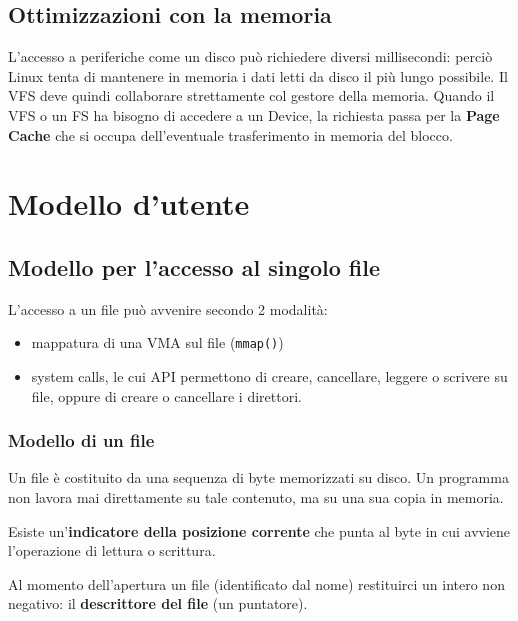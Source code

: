 \documentclass[12pt, a4paper]{report}
\begin{document}
\section{Ottimizzazioni con la memoria}
L'accesso a periferiche come un disco può richiedere diversi millisecondi:
perciò Linux tenta di mantenere in memoria i dati letti da disco il più lungo
possibile. Il VFS deve quindi collaborare strettamente col gestore della
memoria. Quando il VFS o un FS ha bisogno di accedere a un Device, la richiesta
passa per la \textbf{Page Cache} che si occupa dell'eventuale trasferimento in
memoria del blocco.

\chapter{Modello d'utente}
\section{Modello per l'accesso al singolo file}
L'accesso a un file può avvenire secondo 2 modalità:
\begin{itemize}
	\item mappatura di una VMA sul file (\texttt{mmap()})
	\item system calls, le cui API permettono di creare, cancellare, leggere o
		scrivere su file, oppure di creare o cancellare i direttori.
\end{itemize}
\subsection{Modello di un file}
Un file è costituito da una sequenza di byte memorizzati su disco. Un programma
non lavora mai direttamente su tale contenuto, ma su una sua copia in memoria.

Esiste un'\textbf{indicatore della posizione corrente} che punta al byte in cui
avviene l'operazione di lettura o scrittura.

Al momento dell'apertura un file (identificato dal nome) restituirci un intero
non negativo: il \textbf{descrittore del file} (un puntatore).
\end{document}
